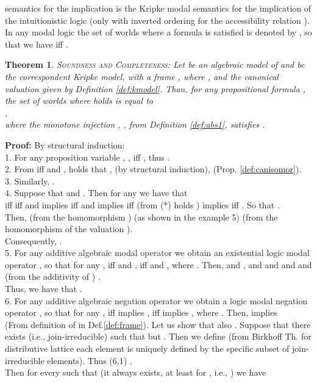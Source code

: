 \documentclass[10pt,twocolumn]{article}
\newtheorem{theo}{Theorem}
\begin{document}
semantics for the implication is the Kripke modal semantics for the
implication of the intuitionistic logic (only with inverted ordering
for the accessibility relation ).\\ In any modal logic
the set of worlds where a formula  is satisfied is denoted by
, so that we have  iff .
 \begin{theo}\label{th:kmodel} \textsc{Soundness and Completeness:}
 Let   be an algebraic model of  and
 be the correspondent
  Kripke model, with a frame
, where
, and the canonical valuation  given by Definition \ref{def:kmodel}. Than, for any
propositional
formula , the set of worlds where  holds is equal to \\
,\\
where the monotone injection , , from Definition \ref{def:abs1}, satisfies .
\end{theo}
\textbf{Proof:} By structural induction: \\
1. For any proposition variable , ,
 iff , thus .\\
 2. From  iff  and , holds that , (by structural induction), (Prop.
\ref{def:canisomor}).\\
3.  Similarly, .\\
4. Suppose that  and
. Then for any  we have that\\
 iff  iff  and  implies 
iff   and  implies  iff (from
(*) holds )  implies  iff
. So that . \\
Then,  (from the homomorphism )  (as shown in the example 5)
 (from the
homomorphism of the valuation ).\\ Consequently, .\\
 5. For any additive algebraic modal operator
 we obtain an existential logic modal operator
, so that for any ,  iff  and ,  iff
 and ,
 where .
Then,  and  ,  and  and  and  and  (from the additivity of
) .\\
Thus, we have that .\\
6. For any additive algebraic negation operator  we
obtain a  logic modal negation operator , so that for any ,  iff  implies , iff
 implies ,
 where .
Then,  implies \\
 (From definition of  in Def.\ref{def:frame}).
 Let us show that also . Suppose that there exists  (i.e., join-irreducible) such that  but . Then we define  (from Birkhoff Th. for distributive lattice each element is
  uniquely defined by the specific subset of join-irreducible
  elements).
 Thus (6.1) .\\
 Then for every  such that  (it always exists, at least for , i.e., ) we have
\end{document}
